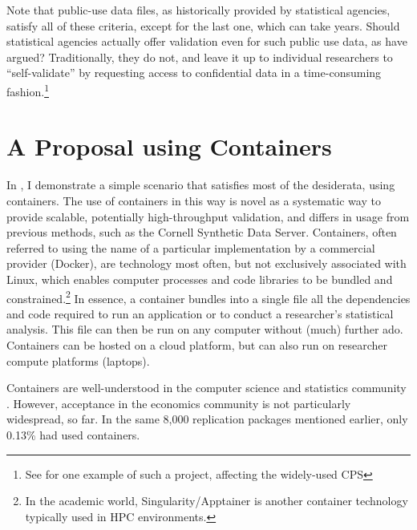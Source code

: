\documentclass[12pt]{article}
\begin{document}
Note that public-use data files, as historically provided by statistical agencies, satisfy all of these criteria, except for the last one, which can take years. Should statistical agencies actually offer validation even for such public use data, as \citet{reiter_verification_2009} have argued? Traditionally, they do not, and leave it up to individual researchers to ``self-validate'' by requesting access to confidential data in a time-consuming fashion.\footnote{See \cite{armour_using_2016} for one example of such a project, affecting the widely-used \ac{CPS}}

\section{A Proposal using Containers}
\label{sec:proposal}

In \citet{vilhuber2025e}, I demonstrate a simple scenario that satisfies most of the desiderata,  using containers. 
%
The use of containers in this way is novel as a systematic way to provide scalable, potentially high-throughput validation, and differs in usage from previous methods, such as the Cornell Synthetic Data Server. 
%
Containers, often referred to using the name of a particular implementation by a commercial provider (Docker), are technology most often, but not exclusively associated with Linux, which enables computer processes and code libraries to be bundled and constrained.\footnote{In the academic world, Singularity/Apptainer is another container technology typically used in \ac{HPC} environments.} In essence, a container bundles into a single file all the dependencies and code required to run an application or to conduct a researcher's statistical analysis. This file can then be run on any computer without (much) further ado. Containers can be hosted on a cloud platform, but can also run  on researcher compute platforms (laptops).  

Containers are well-understood in the computer science and statistics community \citep{boettiger_introduction_2015,moreau_containers_2023}. However, acceptance in the economics community is not particularly widespread, so far. In the same 8,000 replication packages mentioned earlier, only 0.13\% had used containers. 
\end{document}
